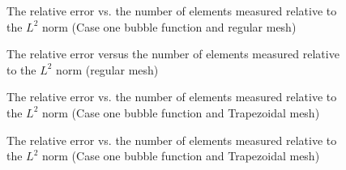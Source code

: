 \documentclass[a4paper,11pt]{article}
\begin{document}
\begin{figure}[h!]
\begin{center}
\caption{The relative error vs. the number of elements measured relative 
to the $L^{2}$ norm (Case one bubble function and regular mesh)}
\end{center}
\end{figure}
%
\begin{figure}[h!]
\begin{center}
\caption{The relative error versus the number of elements measured relative to the $L^{2}$ norm (regular mesh)}
\end{center}
\end{figure}
\begin{figure}[h!]
\begin{center}
\caption{The relative error vs. the number of elements measured relative 
to the $L^{2}$ norm (Case one bubble function and Trapezoidal mesh)}
\end{center}
\end{figure}
%
\begin{figure}[h!]
\begin{center}
\caption{The relative error vs. the number of elements measured relative 
to the $L^{2}$ norm (Case one bubble function and Trapezoidal mesh)}
\end{center}
\end{figure}
%
\end{document}
